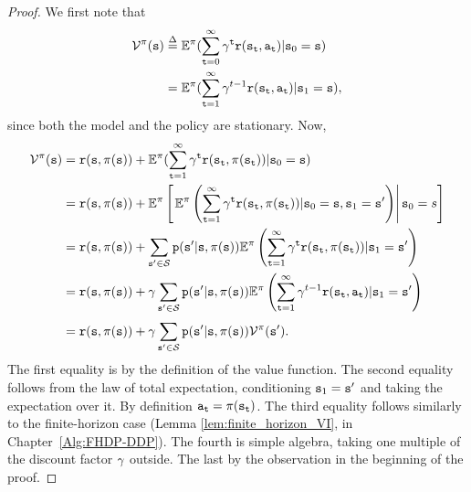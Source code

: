 \begin{proof} We first note that
\begin{align*}
\Value_{}^\policy (\state) &\buildrel \Delta \over = {\E^\policy }(\sum\limits_{\ttime = 0}^\infty  {{\discount ^\ttime}\reward({\state_\ttime},{\action_\ttime})} |{\state_0} = \state)\\
 &= {\E^\policy }(\sum\limits_{\ttime = 1}^\infty  {{\discount ^{t - 1}}\reward({\state_\ttime},{\action_\ttime})} |{\state_1} = \state),
\end{align*}
since both the model and the policy are stationary. Now,
\begin{align*}
\mathcal{V}_{}^\pi ({\tt s}) &= {\tt r}({\tt s},\pi ({\tt s})) + {\mathbb{E}^\pi }(\sum\limits_{{\tt t} = 1}^\infty  {{\gamma^{\tt t}}{\tt r}({{\tt s}_{\tt t}},\pi({{\tt s}_{\tt t}}))} |{{\tt s}_0} = {\tt s})\\
&= {\tt r}({\tt s},\pi ({\tt s})) + {\mathbb{E}^\pi }\left[\left.{\mathbb{E}^\pi }\left(\sum\limits_{{\tt t} = 1}^\infty  {{\gamma^{\tt t}}{\tt r}({{\tt s}_{\tt t}},\pi({{\tt s}_{\tt t}}))} |{{\tt s}_0} = {\tt s}, {\tt s}_1={\tt s}'\right)\right|{{\tt s}_0} = s\right]\\
 &= {\tt r}({\tt s},\pi ({\tt s})) + \sum\limits_{{\tt s}' \in \mathcal{S}}^{} {{\tt p}({\tt s}'|{\tt s},\,} \pi ({\tt s})){\mathbb{E}^\pi }\left(\sum\limits_{{\tt t} = 1}^\infty  {{\gamma^{\tt t}}{\tt r}({{\tt s}_{\tt t}},\pi({{\tt s}_{\tt t}}))} |{{\tt s}_1} = {\tt s}'\right)\\
 &= {\tt r}({\tt s},\pi ({\tt s})) + \gamma \sum\limits_{{\tt s}' \in \mathcal{S}}^{} {{\tt p}({\tt s}'|{\tt s},\,} \pi ({\tt s})){\mathbb{E}^\pi }\left(\sum\limits_{{\tt t} = 1}^\infty  {{\gamma^{t - 1}}{\tt r}({{\tt s}_{\tt t}},{{\tt a}_{\tt t}})} |{{\tt s}_1} = {\tt s}'\right)\\
 &= {\tt r}({\tt s},\pi ({\tt s})) + \gamma \sum\limits_{{\tt s}' \in \mathcal{S}}^{} {{\tt p}({\tt s}'|{\tt s},\,} \pi ({\tt s})){\mathcal{V}^\pi }({\tt s}').
\end{align*}
The first equality is by the definition of the value function. The
second equality follows from the law of total expectation,
conditioning ${\tt s}_1 = {\tt s}'$ and taking the expectation over
it. By definition ${{\tt a}_{\tt t}} = \pi ({{\tt s}_{\tt t}})$.
The third equality follows similarly to the finite-horizon case
(Lemma \ref{lem:finite_horizon_VI}, in Chapter~\ref{Alg:FHDP-DDP}).
The fourth is simple algebra, taking one multiple of the discount
factor $\gamma$ outside. The last by the observation in the
beginning of the proof.
\end{proof}

